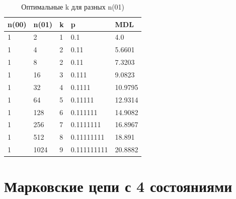 \documentclass[12pt]{article}
\begin{document}
	\begin{table}[!h]
		\caption{Оптимальные k для разных n(01)}
		\label{table:n00n01}
		\begin{center}
			\begin{tabular}{|l|l|l|l|l|}
				\hline
				n(00) & n(01) & k & p & MDL \\
				\hline
				1 & 2 & 1 & 0.1 & 4.0 \\ 
				\hline 
				1 & 4 & 2 & 0.11 & 5.6601 \\ 
				\hline 
				1 & 8 & 2 & 0.11 & 7.3203 \\ 
				\hline 
				1 & 16 & 3 & 0.111 & 9.0823 \\ 
				\hline 
				1 & 32 & 4 & 0.1111 & 10.9795 \\ 
				\hline 
				1 & 64 & 5 & 0.11111 & 12.9314 \\ 
				\hline 
				1 & 128 & 6 & 0.111111 & 14.9082 \\ 
				\hline 
				1 & 256 & 7 & 0.1111111 & 16.8967 \\ 
				\hline 
				1 & 512 & 8 & 0.11111111 & 18.891 \\ 
				\hline 
				1 & 1024 & 9 & 0.111111111 & 20.8882 \\ 
				\hline 
			\end{tabular}
		\end{center}
	\end{table}

	\section*{Марковские цепи с 4 состояниями}
		
	

	
\end{document}
